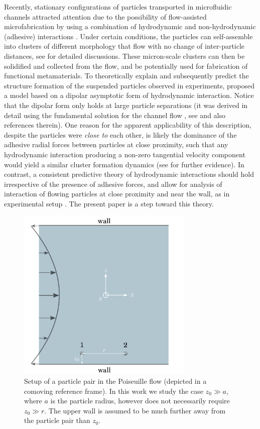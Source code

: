 Recently, stationary configurations of particles transported in microfluidic channels attracted attention due to the possibility of flow-assisted microfabrication by using a combination of hydrodynamic and non-hydrodynamic (\ie adhesive) interactions \citep{tab0,tabeling}. Under certain conditions, the particles can self-assemble into clusters of different morphology that flow with no change of inter-particle distances, see \cite{flow-assist} for detailed discussions. These micron-scale clusters can then be solidified and collected from the flow, and be potentially used for fabrication of functional metamaterials. To theoretically explain and subsequently predict the structure formation of the suspended particles observed in experiments, \cite{tabeling} proposed a
model based on a dipolar asymptotic form of hydrodynamic interaction. Notice that the dipolar form only holds at large particle separations (it was derived in detail using the fundamental solution for the channel flow \citep{LironMochon}, see \cite{Fouxon_2017} and also references therein). One reason for the apparent applicability of this description, despite the particles were \textit{close to} each other, is likely the dominance of the adhesive radial forces between particles at close proximity, such that any hydrodynamic interaction producing a non-zero tangential velocity component would yield a similar cluster formation dynamics (see \cite{flow-assist} for further evidence). In contrast, a consistent predictive theory of hydrodynamic interactions should hold irrespective of the presence of adhesive forces, and allow for analysis of interaction of flowing particles at close proximity and near the wall, as in experimental setup \citep{tabeling}. The present paper is a step toward this theory.
%
\begin{figure}[t]
 \centering
 \includegraphics[width=0.75\textwidth]{setup.png}
 \caption{Setup of a particle pair in the Poiseuille flow (depicted in a comoving reference frame). In this work we study the case $z_0 \gg a$, where $a$ is the particle radius, however does not necessarily require $z_0\gg r$. The upper wall is assumed to be much further away from the particle pair than $z_0$.
}
 \label{fig:setup}
\end{figure}


